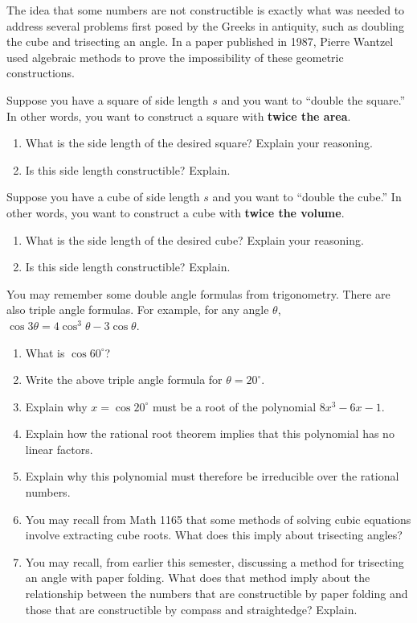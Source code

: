 The idea that some numbers are not constructible is exactly what was needed to address several problems first posed by the Greeks in antiquity, such as doubling the cube and trisecting an angle.  In a paper published in 1987, Pierre Wantzel used algebraic methods to prove the impossibility of these geometric constructions.  

\begin{prob}
Suppose you have a square of side length $s$ and you want to ``double the square.''  In other words, you want to construct a square with \textbf{twice the area}.  
\begin{enumerate}
\item What is the side length of the desired square?  Explain your reasoning. 
\item Is this side length constructible?  Explain.  
\end{enumerate}
\end{prob}

\begin{prob}
Suppose you have a cube of side length $s$ and you want to ``double the cube.''  In other words, you want to construct a cube with \textbf{twice the volume}.  
\begin{enumerate}
\item What is the side length of the desired cube?  Explain your reasoning. 
\item Is this side length constructible?  Explain.  
\end{enumerate}
\end{prob}

\begin{prob}
You may remember some double angle formulas from trigonometry.  There are also triple angle formulas.  For example, for any angle $\theta$,  $\cos3\theta=4\cos^3\theta -3\cos\theta$.  
\begin{enumerate}
\item What is $\cos60^\circ$?
\item Write the above triple angle formula for $\theta = 20^\circ$.  %
\item Explain why $x = \cos20^\circ$ must be a root of the polynomial $8x^3-6x-1$.  
\item Explain how the rational root theorem implies that this polynomial has no linear factors.  
\item Explain why this polynomial must therefore be irreducible over the rational numbers.  
\item You may recall from Math 1165 that some methods of solving cubic equations involve extracting cube roots.  What does this imply about trisecting angles?  
\item You may recall, from earlier this semester, discussing a method for trisecting an angle with paper folding.  What does that method imply about the relationship between the numbers that are constructible by paper folding and those that are constructible by compass and straightedge?  Explain.  
\end{enumerate}
\end{prob}
